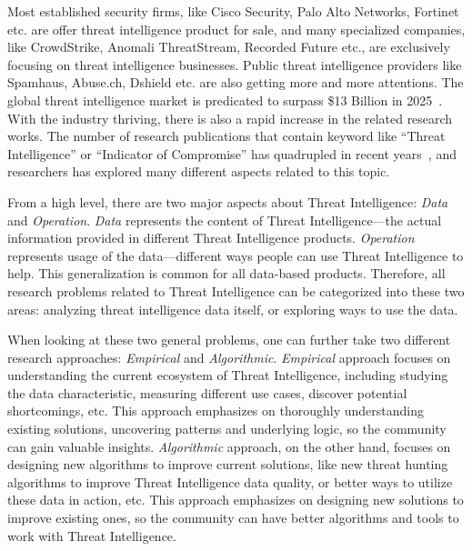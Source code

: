 \begin{dissertationintroduction}
Most established security firms, like Cisco Security, Palo Alto Networks,
Fortinet etc. are offer threat intelligence product for sale, and many 
specialized companies, like CrowdStrike, Anomali ThreatStream,
Recorded Future etc., are exclusively focusing on threat intelligence
businesses. Public threat intelligence providers like Spamhaus, Abuse.ch, 
Dshield etc. are also getting more and more attentions. The global threat 
intelligence market is predicated to surpass \$13 Billion in 
2025~\cite{tipredict2018}. With the industry thriving, there is also 
a rapid increase in the related research works. The number of research 
publications that contain keyword like ``Threat Intelligence'' or 
``Indicator of Compromise'' has quadrupled in recent 
years~\cite{tounsi2018survey}, and researchers has explored many different
aspects related to this topic. 

From a high level, there are two major aspects about Threat Intelligence: 
\textit{Data} and \textit{Operation}. \textit{Data} represents the content 
of Threat Intelligence---the actual information provided in different Threat
Intelligence products. \textit{Operation} represents usage of the 
data---different ways people can use Threat Intelligence to help. This
generalization is common for all data-based products. Therefore,
all research problems related to Threat Intelligence can be categorized into
these two areas: analyzing threat intelligence data itself, or exploring
ways to use the data.

When looking at these two general problems, one can further 
take two different research approaches: \textit{Empirical} and 
\textit{Algorithmic}. \textit{Empirical} approach focuses on understanding
the current ecosystem of Threat Intelligence, including studying the 
data characteristic, measuring different use cases, discover potential 
shortcomings, etc. This approach emphasizes on thoroughly understanding
existing solutions, uncovering patterns and underlying logic, 
so the community can gain valuable insights.
\textit{Algorithmic} approach, on the other hand, 
focuses on designing new algorithms to 
improve current solutions, like new threat hunting algorithms to improve 
Threat Intelligence data quality, or better ways to utilize these data 
in action, etc. This approach emphasizes on designing new solutions to 
improve existing ones, so the community can have better algorithms and
tools to work with Threat Intelligence.


\end{dissertationintroduction}
